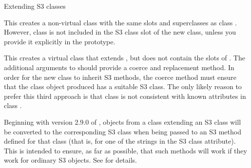 \begin{Section}{Extending S3 classes}

This creates a non-virtual class with the same slots and superclasses
as class .  However, class  is not included in
the S3 class slot of the new class, unless you provide it explicitly
in the prototype.


This creates a virtual class that extends , but does not
contain the slots of .  The additional arguments to
 should provide a coerce and replacement method.
In order for the new class to inherit S3 methods, the coerce method must
ensure that the class  object produced has a suitable S3
class.  The only likely reason to prefer this third approach is that
class  is not consistent with known attributes in class
.

Beginning with version 2.9.0 of \R{}, objects from a class extending an
S3 class will be converted to the corresponding S3 class when being
passed to an S3 method defined for that class (that is, for one of the
strings in the S3 class attribute).  This is intended to ensure, as
far as possible, that such methods will work if they work for ordinary
S3 objects.  See  for details.


\end{Section}
%
